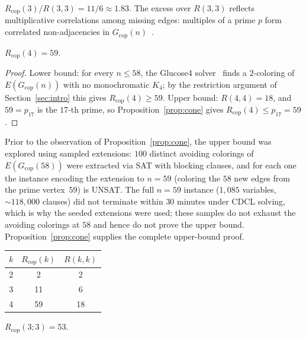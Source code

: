 \documentclass[12pt]{article}
\newcommand{\Rcop}{R_{\mathrm{cop}}}
\newcommand{\Gcop}{G_{\mathrm{cop}}}
\begin{document}
\begin{remark}\label{rem:ratio3}
$\Rcop(3)/R(3,3)=11/6\approx 1.83$. The excess over $R(3,3)$
reflects multiplicative correlations among missing edges:
multiples of a prime $p$ form correlated non-adjacencies in
$\Gcop(n)$~\cite{erdos1997coprime}.
\end{remark}

\begin{theorem}\label{thm:rcop4}
$\Rcop(4)=59$.
\end{theorem}

\begin{proof}
Lower bound: for every $n\le 58$, the Glucose4
solver~\cite{glucose} finds a $2$-coloring of $E(\Gcop(n))$ with no
monochromatic $K_4$; by the restriction argument of
Section~\ref{sec:intro} this gives $\Rcop(4) \ge 59$.
Upper bound: $R(4,4) = 18$, and $59 = p_{17}$ is the $17$-th prime,
so Proposition~\ref{prop:cone} gives $\Rcop(4) \le p_{17} = 59$.
\end{proof}

\begin{remark}\label{rem:rcop4-extension}
Prior to the observation of Proposition~\ref{prop:cone}, the upper
bound was explored using sampled extensions: $100$ distinct avoiding
colorings of $E(\Gcop(58))$ were extracted via SAT with blocking
clauses, and for each one the instance encoding the extension to
$n=59$ (coloring the $58$ new edges from the prime vertex~$59$) is
UNSAT. The full $n=59$ instance ($1{,}085$ variables,
${\sim}118{,}000$ clauses) did not terminate within $30$ minutes
under CDCL solving, which is why the seeded extensions were used;
these samples do not exhaust the avoiding colorings at $58$ and hence
do not prove the upper bound. Proposition~\ref{prop:cone} supplies the
complete upper-bound proof.
\end{remark}

\begin{center}
\begin{tabular}{@{}ccc@{}}
\toprule
$k$ & $\Rcop(k)$ & $R(k,k)$ \\
\midrule
2 & 2  & 2  \\
3 & 11 & 6  \\
4 & 59 & 18 \\
\bottomrule
\end{tabular}
\end{center}

\begin{theorem}\label{thm:rcop33}
$\Rcop(3;3)=53$.
\end{theorem}
\end{document}
